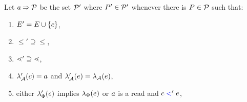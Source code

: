 \begin{definition}
  \label{def:prefix}
Let $a \mathbin\Rightarrow \mathcal{P}$ be the set $\mathcal{P}'$ where $P'\in\mathcal{P}'$ whenever
there is $P\in\mathcal{P}$ such that:
\begin{enumerate}
\item\label{pre-E} $E' = E \cup \{c\}$,
\item\label{pre-le} ${\le'}\supseteq{\le}$, %
\item\label{pre-gtN} ${\lessdot'}\supseteq{\lessdot}$, %
\item\label{pre-act} $\lambda_{\mathcal{A}}'(c) = a$ and $\lambda_{\mathcal{A}}'(e) = \lambda_{\mathcal{A}}(e)$,
\item\label{pre-implies} either $\lambda_{\Phi}'(e)$ implies $\lambda_{\Phi}(e)$ or
  $a$ is a read and $c\mathrel{{\color{blue}<}}'e$,

\end{enumerate}
\end{definition}
